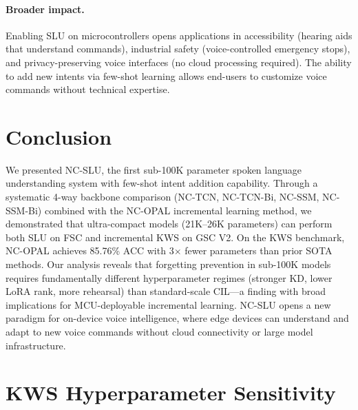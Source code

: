 \documentclass[11pt]{article}
\begin{document}
\paragraph{Broader impact.}
Enabling SLU on microcontrollers opens applications in accessibility (hearing aids that understand commands), industrial safety (voice-controlled emergency stops), and privacy-preserving voice interfaces (no cloud processing required).
The ability to add new intents via few-shot learning allows end-users to customize voice commands without technical expertise.

\section{Conclusion}

We presented NC-SLU, the first sub-100K parameter spoken language understanding system with few-shot intent addition capability.
Through a systematic 4-way backbone comparison (NC-TCN, NC-TCN-Bi, NC-SSM, NC-SSM-Bi) combined with the NC-OPAL incremental learning method, we demonstrated that ultra-compact models (21K--26K parameters) can perform both SLU on FSC and incremental KWS on GSC V2.
On the KWS benchmark, NC-OPAL achieves 85.76\% ACC with 3$\times$ fewer parameters than prior SOTA methods.
Our analysis reveals that forgetting prevention in sub-100K models requires fundamentally different hyperparameter regimes (stronger KD, lower LoRA rank, more rehearsal) than standard-scale CIL---a finding with broad implications for MCU-deployable incremental learning.
NC-SLU opens a new paradigm for on-device voice intelligence, where edge devices can understand and adapt to new voice commands without cloud connectivity or large model infrastructure.



\appendix

\section{KWS Hyperparameter Sensitivity}
\label{app:hyperparam}
\end{document}
